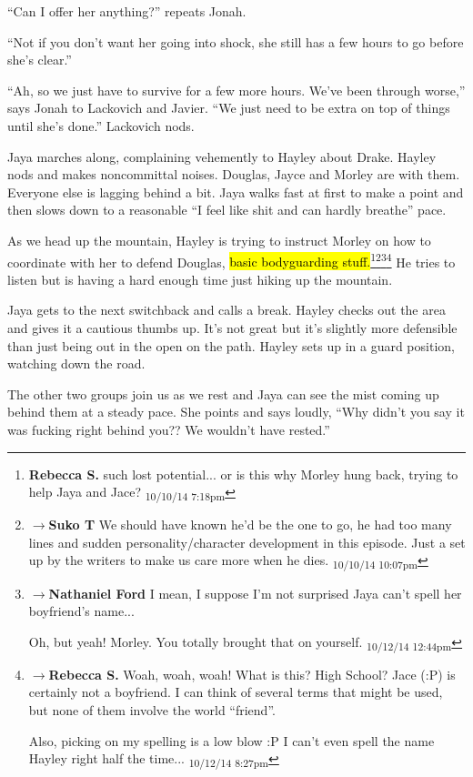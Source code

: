 ``Can I offer her anything?'' repeats Jonah.

``Not if you don't want her going into shock, she still has a few hours to go before she's clear.''

``Ah, so we just have to survive for a few more hours.  We've been through worse,'' says Jonah to Lackovich and Javier.  ``We just need to be extra on top of things until she's done.''  Lackovich nods.



Jaya marches along, complaining vehemently to Hayley about Drake.  Hayley nods and makes noncommittal noises.  Douglas, Jayce and Morley are with them.  Everyone else is lagging behind a bit.  Jaya walks fast at first to make a point and then slows down to a reasonable ``I feel like shit and can hardly breathe'' pace.

As we head up the mountain, Hayley is trying to instruct Morley on how to coordinate with her to defend Douglas, \hl{basic bodyguarding stuff.}\footnote{\textbf{Rebecca S. }such lost potential... or is this why Morley hung back, trying to help Jaya and Jace? \textsubscript{10/10/14 7:18pm}}\footnote{$\rightarrow$\textbf{Suko T }We should have known he'd be the one to go, he had too many lines and sudden personality/character development in this episode.  Just a set up by the writers to make us care more when he dies. \textsubscript{10/10/14 10:07pm}}\footnote{$\rightarrow$\textbf{Nathaniel Ford }I mean, I suppose I'm not surprised Jaya can't spell her boyfriend's name...

Oh, but yeah! Morley. You totally brought that on yourself. \textsubscript{10/12/14 12:44pm}}\footnote{$\rightarrow$\textbf{Rebecca S. }Woah, woah, woah! What is this? High School?  Jace (:P) is certainly not a boyfriend. I can think of several terms that might be used, but none of them involve the world ``friend''.  

Also, picking on my spelling is a low blow :P  I can't even spell the name Hayley right half the time... \textsubscript{10/12/14 8:27pm}}  He tries to listen but is having a hard enough time just hiking up the mountain.

Jaya gets to the next switchback and calls a break.  Hayley checks out the area and gives it a cautious thumbs up.  It's not great but it's slightly more defensible than just being out in the open on the path.  Hayley sets up in a guard position, watching down the road.  

The other two groups join us as we rest and Jaya can see the mist coming up behind them at a steady pace.  She points and says loudly, ``Why didn't you say it was fucking right behind you??  We wouldn't have rested.''

